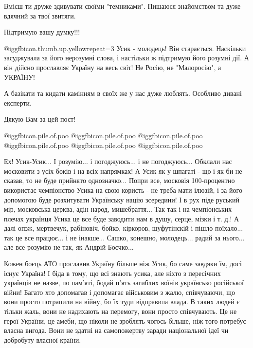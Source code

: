 \begin{itemize}
Вмієш ти друже здивувати своїми "темниками". Пишаюся знайомством та дуже вдячний за твої звитяги.

Підтримую вашу думку!!!


 @igg{fbicon.thumb.up.yellow}{repeat=3} Усик - молодець! Він старається. Наскільки засуджувала за його нерозумні
слова, і настільки ж підтримую його розумні дії. А він дійсно прославляє
Україну на весь світ! Не Росію, не "Малоросію", а УКРАЇНУ!

А базікати та кидати камінням в своїх же у нас дуже люблять. Особливо дивані
експерти.

Дякую Вам за цей пост!


\begin{itemize} %
 @igg{fbicon.pile.of.poo}   @igg{fbicon.pile.of.poo}   @igg{fbicon.pile.of.poo}   @igg{fbicon.pile.of.poo}   @igg{fbicon.pile.of.poo}   @igg{fbicon.pile.of.poo} 
\end{itemize} %


Ех! Усик-Усик... І розумію... і погоджуюсь... і не погоджуюсь... Обклали нас
московити з усіх боків і на всіх напрямках! А Усик як у шпагаті - що і як би не
сказав, то не буде прийнято однозначко... Попри все, московія 100-процентно
використає чемпіонство Усика на свою користь - не треба мати ілюзій, і за його
допомогою буде розхитувати Українську націю зсередини! І в рух піде руський
мір, московська церква, адін народ, мишебраття... Так-так-і на чемпіонських плечах
українця Усика це все буде заводити нам в душу, серце, мізки і т. д.! А далі
опзж, мертвечук, рабіновіч, бойко, кіркоров, шуфутінскій і пішло-поїхало... так це
все працює... і не інакше... Сашко, конешно, молодець... радий за нього... але все
розумію не так, як Андрій Боєчко...


Кожен боєць АТО прославив Україну більше ніж Усик, бо саме завдяки їм, досі
існує Україна! І біда в тому, що всі знають усика, але ніхто з пересічних
українців не назве, по пам'яті, бодай п'ять загиблих воїнів українсько
російської війни! Багато хто допомагав і допомагає військовим з жалю,
співчуваючи, що вони просто потрапили на війну, бо їх туди відправила влада. В
таких людей є тільки жаль, вони не надихають на перемогу, вони просто
співчувають. Це не герої України, це амеби, що ніколи не зроблять чогось
більше, ніж того потребує власна вигода. Вони не здатні на самопожертву заради
національної ідеї чи добробуту власної країни.


\end{itemize}
